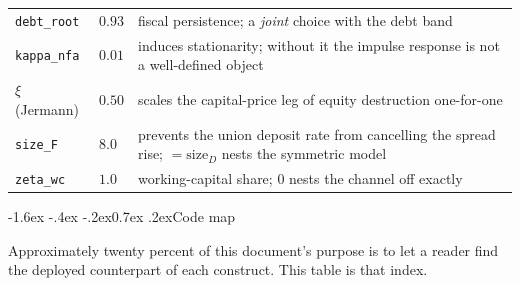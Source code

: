 \documentclass[10pt,a4paper]{article}
\makeatletter
\theoremstyle{definition}
\theoremstyle{plain}
\theoremstyle{remark}
\newcommand{\code}[1]{\texttt{#1}}
\renewcommand\section{\@startsection{section}{1}{\z@}%
  {-1.6ex \@plus -.4ex \@minus -.2ex}{0.7ex \@plus.2ex}{\normalfont\large\bfseries}}
\makeatother
\begin{document}
\begin{center}
\begin{longtable}{@{}p{}p{}p{}@{}}
\code{debt\_root} & $0.93$ & fiscal persistence; a \emph{joint} choice with the debt band \\
\code{kappa\_nfa} & $0.01$ & induces stationarity; without it the impulse response is not a
well-defined object \\
$\xi$ (Jermann) & $0.50$ & scales the capital-price leg of equity destruction one-for-one \\
\code{size\_F} & $8.0$ & prevents the union deposit rate from cancelling the spread rise;
$=\text{size}_D$ nests the symmetric model \\
\code{zeta\_wc} & $1.0$ & working-capital share; $0$ nests the channel off exactly \\
\bottomrule
\end{longtable}
\end{center}

\section{Code map}

\noindent Approximately twenty percent of this document's purpose is to let a reader find the
deployed counterpart of each construct. This table is that index.
\end{document}

